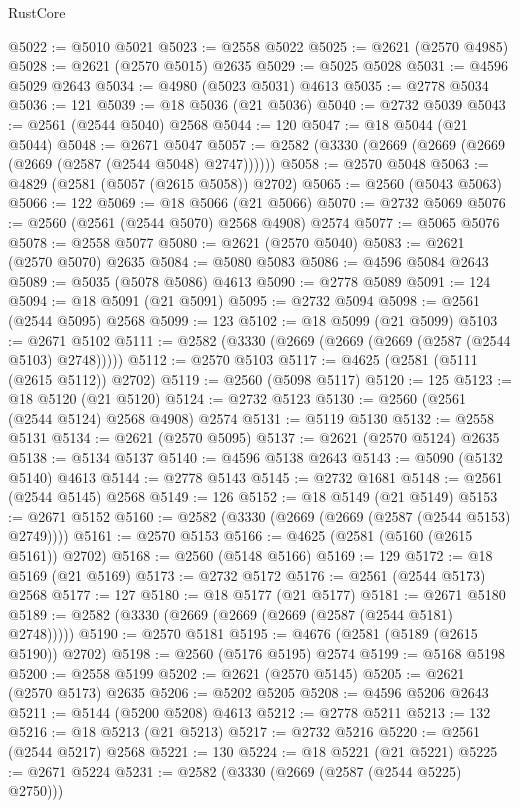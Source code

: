 \begin{lexlean}{RustCore}
\begin{coremodule}
@5022 := @5010 @5021
@5023 := @2558 @5022
@5025 := @2621 (@2570 @4985)
@5028 := @2621 (@2570 @5015) @2635
@5029 := @5025 @5028
@5031 := @4596 @5029 @2643
@5034 := @4980 (@5023 @5031) @4613
@5035 := @2778 @5034
@5036 := 121
@5039 := @18 @5036 (@21 @5036)
@5040 := @2732 @5039
@5043 := @2561 (@2544 @5040) @2568
@5044 := 120
@5047 := @18 @5044 (@21 @5044)
@5048 := @2671 @5047
@5057 := @2582 (@3330 (@2669 (@2669 (@2669 (@2669 (@2587 (@2544 @5048) @2747))))))
@5058 := @2570 @5048
@5063 := @4829 (@2581 (@5057 (@2615 @5058)) @2702)
@5065 := @2560 (@5043 @5063)
@5066 := 122
@5069 := @18 @5066 (@21 @5066)
@5070 := @2732 @5069
@5076 := @2560 (@2561 (@2544 @5070) @2568 @4908) @2574
@5077 := @5065 @5076
@5078 := @2558 @5077
@5080 := @2621 (@2570 @5040)
@5083 := @2621 (@2570 @5070) @2635
@5084 := @5080 @5083
@5086 := @4596 @5084 @2643
@5089 := @5035 (@5078 @5086) @4613
@5090 := @2778 @5089
@5091 := 124
@5094 := @18 @5091 (@21 @5091)
@5095 := @2732 @5094
@5098 := @2561 (@2544 @5095) @2568
@5099 := 123
@5102 := @18 @5099 (@21 @5099)
@5103 := @2671 @5102
@5111 := @2582 (@3330 (@2669 (@2669 (@2669 (@2587 (@2544 @5103) @2748)))))
@5112 := @2570 @5103
@5117 := @4625 (@2581 (@5111 (@2615 @5112)) @2702)
@5119 := @2560 (@5098 @5117)
@5120 := 125
@5123 := @18 @5120 (@21 @5120)
@5124 := @2732 @5123
@5130 := @2560 (@2561 (@2544 @5124) @2568 @4908) @2574
@5131 := @5119 @5130
@5132 := @2558 @5131
@5134 := @2621 (@2570 @5095)
@5137 := @2621 (@2570 @5124) @2635
@5138 := @5134 @5137
@5140 := @4596 @5138 @2643
@5143 := @5090 (@5132 @5140) @4613
@5144 := @2778 @5143
@5145 := @2732 @1681
@5148 := @2561 (@2544 @5145) @2568
@5149 := 126
@5152 := @18 @5149 (@21 @5149)
@5153 := @2671 @5152
@5160 := @2582 (@3330 (@2669 (@2669 (@2587 (@2544 @5153) @2749))))
@5161 := @2570 @5153
@5166 := @4625 (@2581 (@5160 (@2615 @5161)) @2702)
@5168 := @2560 (@5148 @5166)
@5169 := 129
@5172 := @18 @5169 (@21 @5169)
@5173 := @2732 @5172
@5176 := @2561 (@2544 @5173) @2568
@5177 := 127
@5180 := @18 @5177 (@21 @5177)
@5181 := @2671 @5180
@5189 := @2582 (@3330 (@2669 (@2669 (@2669 (@2587 (@2544 @5181) @2748)))))
@5190 := @2570 @5181
@5195 := @4676 (@2581 (@5189 (@2615 @5190)) @2702)
@5198 := @2560 (@5176 @5195) @2574
@5199 := @5168 @5198
@5200 := @2558 @5199
@5202 := @2621 (@2570 @5145)
@5205 := @2621 (@2570 @5173) @2635
@5206 := @5202 @5205
@5208 := @4596 @5206 @2643
@5211 := @5144 (@5200 @5208) @4613
@5212 := @2778 @5211
@5213 := 132
@5216 := @18 @5213 (@21 @5213)
@5217 := @2732 @5216
@5220 := @2561 (@2544 @5217) @2568
@5221 := 130
@5224 := @18 @5221 (@21 @5221)
@5225 := @2671 @5224
@5231 := @2582 (@3330 (@2669 (@2587 (@2544 @5225) @2750)))

\end{coremodule}
\end{lexlean}
